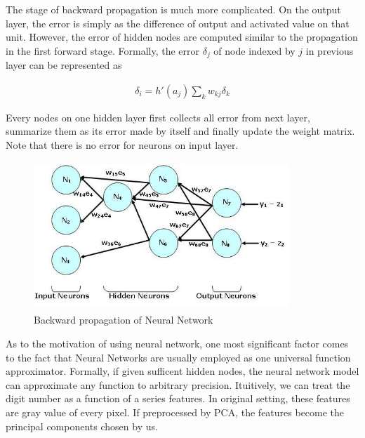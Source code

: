 \documentclass{article} %
\begin{document}
The stage of backward propagation is much more complicated. On the output
layer, the error is simply as the difference of output and activated value on
that unit. However, the error of hidden nodes are computed similar to the
propagation in the first forward stage. Formally, the error $\delta_j$ of node indexed by
$j$ in previous layer can be represented as 

\begin{align}
    \delta_i = h'(a_j) \sum_{k} w_{kj} \delta_k
\end{align}

Every nodes on one hidden layer first collects all
error from next layer, summarize them as its error made by itself and finally
update the weight matrix. Note that there is no error for neurons on input
layer. 

\begin{figure}[h]
    \centering
    \includegraphics[height=2.2in,width=3.8in]{./images/BackPropagation.jpg}
    \caption{Backward propagation of Neural Network}
\end{figure}


As to the motivation of using neural network, one most significant factor
comes to the fact that Neural Networks are usually employed as one universal
function approximator. Formally, if given sufficent hidden nodes, the neural
network model can approximate any function to arbitrary precision. Ituitively,
we can treat the digit number as a function of a series features. In original
setting, these features are gray value of every pixel. If preprocessed by PCA,
the features become the principal components chosen by us. 
\end{document}
